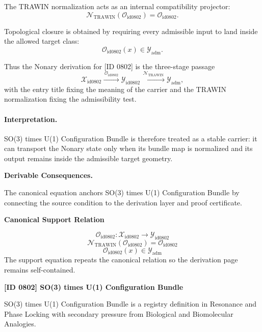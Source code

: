 The TRAWIN normalization acts as an internal compatibility projector:\[
\mathcal{N}_{\mathrm{TRAWIN}}(\mathcal{O}_{\mathrm{id0802}})=\mathcal{O}_{\mathrm{id0802}}.
\]

Topological closure is obtained by requiring every admissible input to land inside the allowed target class:\[
\mathcal{O}_{\mathrm{id0802}}(x)\in\mathcal{Y}_{\mathrm{adm}}.
\]

Thus the Nonary derivation for [ID 0802] is the three-stage passage
\[
\mathcal{X}_{\mathrm{id0802}}\xrightarrow{\,\mathcal{O}_{\mathrm{id0802}}\,} \mathcal{Y}_{\mathrm{id0802}}\xrightarrow{\,\mathcal{N}_{\mathrm{TRAWIN}}\,} \mathcal{Y}_{\mathrm{adm}},
\]
with the entry title fixing the meaning of the carrier and the TRAWIN normalization fixing the admissibility test.

\paragraph{Interpretation.} SO(3) times U(1) Configuration Bundle is therefore treated as a stable carrier: it can transport the Nonary state only when its bundle map is normalized and its output remains inside the admissible target geometry.

\par\vspace{0.35em}
\noindent\textbf{Derivable Consequences.}\quad
\begingroup
\footnotesize
\raggedright
The canonical equation anchors SO(3) times U(1) Configuration Bundle by connecting the source condition to the derivation layer and proof certificate.
\par\endgroup

\noindent\textbf{Canonical Support Relation}\par
\[
\mathcal{O}_{\mathrm{id0802}}:\mathcal{X}_{\mathrm{id0802}}\longrightarrow\mathcal{Y}_{\mathrm{id0802}}
\]
\[
\mathcal{N}_{\mathrm{TRAWIN}}(\mathcal{O}_{\mathrm{id0802}})=\mathcal{O}_{\mathrm{id0802}}
\]
\[
\mathcal{O}_{\mathrm{id0802}}(x)\in\mathcal{Y}_{\mathrm{adm}}
\]
\noindent The support equation repeats the canonical relation so the derivation page remains self-contained.\par

\clearpage
\noindent\textbf{[ID 0802] SO(3) times U(1) Configuration Bundle}\par
\vspace{0.35em}
\begingroup\small
{}
SO(3) times U(1) Configuration Bundle is a registry definition in Resonance and Phase Locking with secondary pressure from Biological and Biomolecular Analogies.

